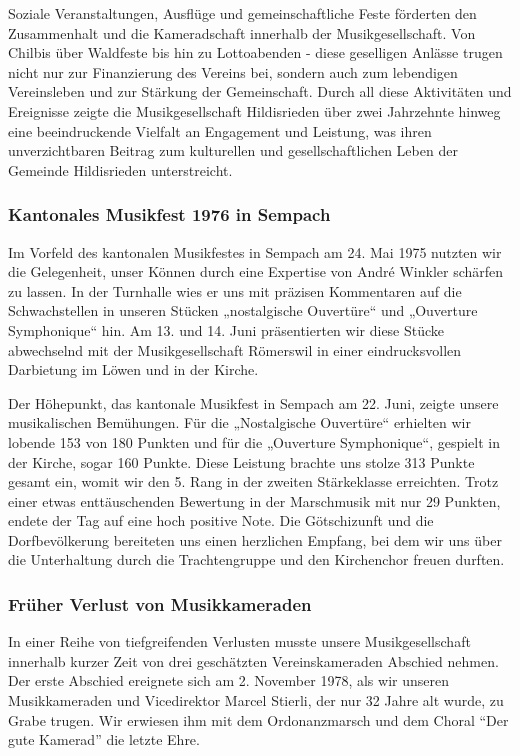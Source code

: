 \begin{history}
    Soziale Veranstaltungen, Ausflüge und gemeinschaftliche Feste förderten den
    Zusammenhalt und die Kameradschaft innerhalb der Musikgesellschaft. Von
    Chilbis über Waldfeste bis hin zu Lottoabenden - diese geselligen Anlässe
    trugen nicht nur zur Finanzierung des Vereins bei, sondern auch zum
    lebendigen Vereinsleben und zur Stärkung der Gemeinschaft. Durch all diese
    Aktivitäten und Ereignisse zeigte die Musikgesellschaft Hildisrieden über
    zwei Jahrzehnte hinweg eine beeindruckende Vielfalt an Engagement und
    Leistung, was ihren unverzichtbaren Beitrag zum kulturellen und
    gesellschaftlichen Leben der Gemeinde Hildisrieden unterstreicht.

    \clearpage

    \subsubsection{Kantonales Musikfest 1976 in Sempach}

    Im Vorfeld des kantonalen Musikfestes in Sempach am 24. Mai 1975 nutzten wir
    die Gelegenheit, unser Können durch eine Expertise von André Winkler
    schärfen zu lassen. In der Turnhalle wies er uns mit präzisen Kommentaren
    auf die Schwachstellen in unseren Stücken „nostalgische Ouvertüre“ und
    „Ouverture Symphonique“ hin. Am 13. und 14. Juni präsentierten wir diese
    Stücke abwechselnd mit der Musikgesellschaft Römerswil in einer
    eindrucksvollen Darbietung im Löwen und in der Kirche.

    Der Höhepunkt, das kantonale Musikfest in Sempach am 22. Juni, zeigte unsere
    musikalischen Bemühungen. Für die „Nostalgische Ouvertüre“ erhielten wir
    lobende 153 von 180 Punkten und für die „Ouverture Symphonique“, gespielt in
    der Kirche, sogar 160 Punkte. Diese Leistung brachte uns stolze 313 Punkte
    gesamt ein, womit wir den 5. Rang in der zweiten Stärkeklasse erreichten.
    Trotz einer etwas enttäuschenden Bewertung in der Marschmusik mit nur 29
    Punkten, endete der Tag auf eine hoch positive Note. Die Götschizunft und
    die Dorfbevölkerung bereiteten uns einen herzlichen Empfang, bei dem wir uns
    über die Unterhaltung durch die Trachtengruppe und den Kirchenchor freuen
    durften.

    \subsubsection{Früher Verlust von Musikkameraden}
    In einer Reihe von tiefgreifenden Verlusten musste unsere Musikgesellschaft
    innerhalb kurzer Zeit von drei geschätzten Vereinskameraden Abschied nehmen.
    Der erste Abschied ereignete sich am 2. November 1978, als wir unseren
    Musikkameraden und Vicedirektor Marcel Stierli, der nur 32 Jahre alt wurde,
    zu Grabe trugen. Wir erwiesen ihm mit dem Ordonanzmarsch und dem Choral
    \enquote{Der gute Kamerad} die letzte Ehre.


\end{history}
